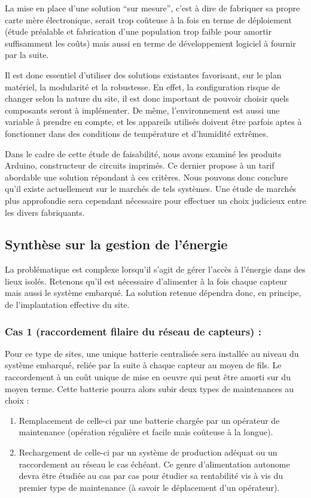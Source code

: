 \documentclass{article}
\begin{document}
La mise en place d’une solution “sur mesure”, c’est à dire de fabriquer
sa propre carte mère électronique, serait trop coûteuse à la fois en
terme de déploiement (étude préalable et fabrication d’une population
trop faible pour amortir suffisamment les coûts) mais aussi en terme de
développement logiciel à fournir par la suite.

Il est donc essentiel d'utiliser des solutions
existantes favorisant, sur le plan matériel, la modularité et la
robustesse. En effet, la configuration risque de changer selon la
nature du site, il est donc important de pouvoir choisir quels
composants seront à implémenter. De même,
l'environnement est aussi une variable à prendre en
compte, et les appareils utilisés doivent être parfois aptes à
fonctionner dans des conditions de température et
d'humidité extrêmes.

Dans le cadre de cette étude de faisabilité, nous avons examiné les
produits Arduino, constructeur de circuits imprimés. Ce dernier propose
à un tarif abordable une solution répondant à ces critères. Nous
pouvons donc conclure qu'il existe actuellement sur le
marchés de tels systèmes. Une étude de marchés plus approfondie sera
cependant nécessaire pour effectuer un choix judicieux entre les divers
fabriquants.

\subsection{Synthèse sur la gestion de l’énergie}
La problématique est complexe lorsqu’il s’agit de gérer l’accès à
l’énergie dans des lieux isolés. Retenons qu’il est nécessaire
d’alimenter à la fois chaque capteur mais aussi le système embarqué. La
solution retenue dépendra donc, en principe, de l’implantation
effective du site.




\subsubsection{Cas 1 (raccordement filaire du réseau de capteurs) :}

Pour ce type de sites, une unique batterie centralisée sera installée au
niveau du système embarqué, reliée par la suite à chaque capteur au
moyen de fils. Le raccordement à un coût unique de mise en oeuvre qui
peut être amorti sur du moyen terme. Cette batterie pourra alors subir
deux types de maintenances au choix : 

\begin{enumerate}
\item Remplacement de celle-ci par une batterie chargée par un opérateur
de maintenance (opération régulière et facile mais coûteuse à la
longue).
\item Rechargement de celle-ci par un système de production adéquat ou
un raccordement au réseau le cas échéant. Ce genre d’alimentation
autonome devra être étudiée au cas par cas pour étudier sa rentabilité
vis à vis du premier type de maintenance (à savoir le déplacement d’un
opérateur).
\end{enumerate}
\end{document}
